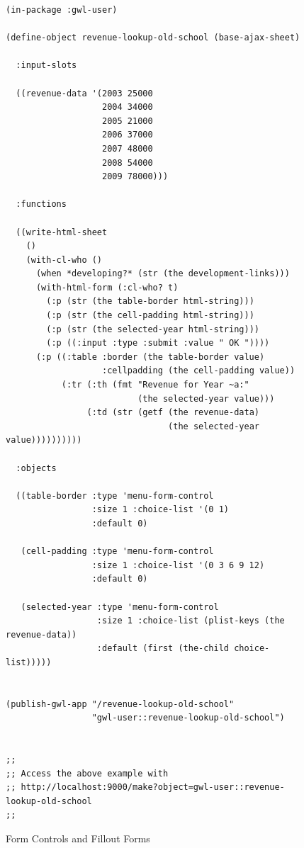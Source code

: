 \documentclass [11pt]{book}
\begin{document}
\begin{figure}
\begin{lrbox}{\boxedverb}
\begin{minipage}{\linewidth}
{\small

\begin{verbatim}(in-package :gwl-user)

(define-object revenue-lookup-old-school (base-ajax-sheet)
  
  :input-slots
  
  ((revenue-data '(2003 25000
                   2004 34000
                   2005 21000
                   2006 37000
                   2007 48000
                   2008 54000
                   2009 78000)))
  
  :functions
  
  ((write-html-sheet
    ()
    (with-cl-who ()
      (when *developing?* (str (the development-links)))
      (with-html-form (:cl-who? t)
        (:p (str (the table-border html-string)))
        (:p (str (the cell-padding html-string)))
        (:p (str (the selected-year html-string)))
        (:p ((:input :type :submit :value " OK "))))
      (:p ((:table :border (the table-border value)
                   :cellpadding (the cell-padding value))
           (:tr (:th (fmt "Revenue for Year ~a:" 
                          (the selected-year value)))
                (:td (str (getf (the revenue-data) 
                                (the selected-year value))))))))))

  :objects
  
  ((table-border :type 'menu-form-control
                 :size 1 :choice-list '(0 1)
                 :default 0)
   
   (cell-padding :type 'menu-form-control
                 :size 1 :choice-list '(0 3 6 9 12)
                 :default 0)
   
   (selected-year :type 'menu-form-control
                  :size 1 :choice-list (plist-keys (the revenue-data))
                  :default (first (the-child choice-list)))))
   

(publish-gwl-app "/revenue-lookup-old-school" 
                 "gwl-user::revenue-lookup-old-school")


;;
;; Access the above example with 
;; http://localhost:9000/make?object=gwl-user::revenue-lookup-old-school
;;

\end{verbatim}}
\end{minipage}
\end{lrbox}
\fbox{\usebox{\boxedverb}}

\caption{Form Controls and Fillout Forms}

\label{fig:gwl-3b}

\end{figure}
\end{document}
